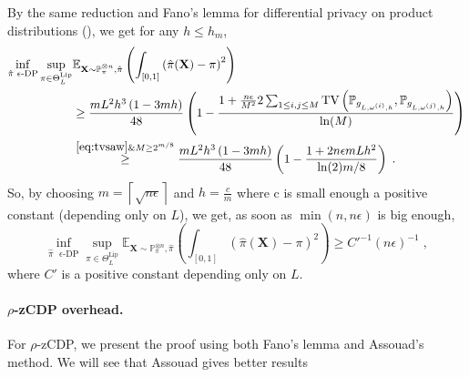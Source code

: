 \documentclass[10pt]{article} %
\newcommand{\Prob}[0]{\mathbb{P}}
\newcommand{\E}[0]{\mathbb{E}}
\newcommand\vect[1]{\mathbf{#1}}
\newcommand\tv[2]{\mathrm{TV}\left( {#1}, {#2} \right)}
\newcommand\p[1]{\left( {#1}\right)}
\newcommand\ceil[1]{\left\lceil {#1}\right\rceil}
\begin{document}
By the same reduction and Fano's lemma for differential privacy on product distributions (), we get for any $h \leq h_m$,
\begin{equation*}
    \begin{aligned}
    \inf_{\hat{\pi} \text{ $\epsilon$-DP}} \sup_{\pi \in \Theta^{\text{Lip}}_L}
    &\E_{\vect{X} \sim \Prob_{\pi}^{\otimes n}, \hat{\pi}}\p{ \int_{[0, 1]}\p{\hat{\pi}(\vect{X})- \pi}^2} \\
    &\geq 
    \frac{mL^2 h^3\p{1 - 3 mh}}{48}
    \p{1 - \frac{1 + \frac{n \epsilon}{M^2} 2 \sum_{1\leq i, j \leq M} \tv{\Prob_{g_{L, \omega^{(i)}, h}}}{\Prob_{g_{L, \omega^{(j)}, h}}}}{\ln (M)}} \\
    &\stackrel{\eqref{eq:tvsaw} \& M\geq 2^{m/8}}{\geq }
    \frac{mL^2h^3  \p{1- 3 mh}}{48}
    \p{1 - \frac{1 + 2 n \epsilon m L h^2}{\ln(2) m/8}} \;.
    \end{aligned}
\end{equation*}
So, by choosing $m = \ceil{\sqrt{n \epsilon}}$ and $h = \frac{c}{m}$  where c is small enough a positive constant (depending only on $L$), we get, %
as soon as $\min(n,n\epsilon)$ is big enough,
\begin{equation*}
    \inf_{\hat{\pi} \text{ $\epsilon$-DP}} \sup_{\pi \in \Theta^{\text{Lip}}_L}
    \E_{\vect{X} \sim \Prob_{\pi}^{\otimes n}, \hat{\pi}}\p{ \int_{[0, 1]}\p{\hat{\pi}(\vect{X})- \pi}^2} \geq C'^{-1} (n\epsilon)^{-1} \;,
\end{equation*}
where $C'$ is a positive constant depending only on $L$.

\paragraph{$\rho$-zCDP overhead.}For $\rho$-zCDP, we present the proof using both Fano's lemma and Assouad's method. We will see that Assouad gives better results
\end{document}
